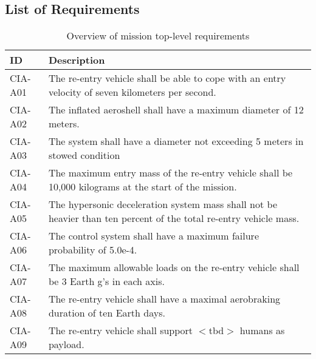 \subsection{List of Requirements} \label{sec:list}

\begin{table}[H]
	\caption{Overview of mission top-level requirements}
	\begin{tabular}{|p{}|p{}|}
    \hline
    ID          & Description                                                                                                      \\ \hline \hline
    CIA-A01 & The re-entry vehicle shall be able to cope with an entry velocity of seven kilometers per second.                \\ \hline
    CIA-A02 & The inflated aeroshell shall have a maximum diameter of 12 meters.                                               \\ \hline
    CIA-A03 & The system shall have a diameter not exceeding 5 meters in stowed condition                                       \\ \hline
    CIA-A04 & The maximum entry mass of the re-entry vehicle shall be 10,000 kilograms at the start of the mission.				\\ \hline
    CIA-A05 & The hypersonic deceleration system mass shall not be heavier than ten percent of the total re-entry vehicle mass. \\ \hline
    CIA-A06 & The control system shall have a maximum failure probability of 5.0e-4.                                           \\ \hline
    CIA-A07 & The maximum allowable loads on the re-entry vehicle shall be 3 Earth g's in each axis.                            \\ \hline
    CIA-A08 & The re-entry vehicle shall have a maximal aerobraking duration of ten Earth days.                                      \\ \hline
    CIA-A09 & The re-entry vehicle shall support $<$\gls{tbd}$>$ humans as payload.                         				            \\ \hline
    \end{tabular}
    \label{tab:toplevelreq}
\end{table}